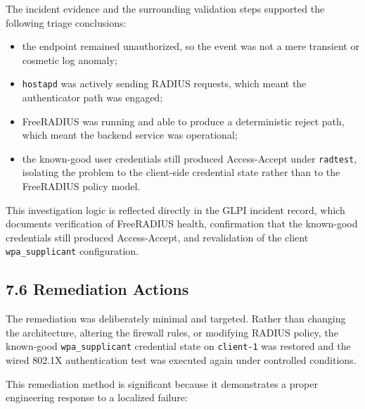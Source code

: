 \documentclass[11pt]{article}
\begin{document}
The incident evidence and the surrounding validation steps supported the following triage conclusions:

\begin{itemize}
    \item the endpoint remained unauthorized, so the event was not a mere transient or cosmetic log anomaly;
    \item \texttt{hostapd} was actively sending RADIUS requests, which meant the authenticator path was engaged;
    \item FreeRADIUS was running and able to produce a deterministic reject path, which meant the backend service was operational;
    \item the known-good user credentials still produced Access-Accept under \texttt{radtest}, isolating the problem to the client-side credential state rather than to the FreeRADIUS policy model.
\end{itemize}

This investigation logic is reflected directly in the GLPI incident record, which documents verification of FreeRADIUS health, confirmation that the known-good credentials still produced Access-Accept, and revalidation of the client \texttt{wpa\_supplicant} configuration.


\subsection{7.6 Remediation Actions}
\label{sec:remediation-actions}

The remediation was deliberately minimal and targeted. Rather than changing the architecture, altering the firewall rules, or modifying RADIUS policy, the known-good \texttt{wpa\_supplicant} credential state on \texttt{client-1} was restored and the wired 802.1X authentication test was executed again under controlled conditions.

This remediation method is significant because it demonstrates a proper engineering response to a localized failure:
\end{document}
